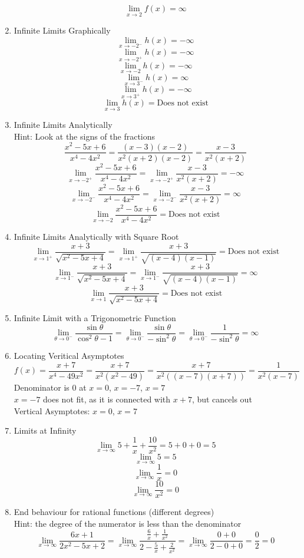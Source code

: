 \documentclass{article}
\begin{document}
\begin{enumerate}
		$$\lim_{x \to 2}{f(x)} = \infty$$
	\item Infinite Limits Graphically
		$$\lim_{x \to -2^-}{h(x)} = - \infty$$
		$$\lim_{x \to -2^+}{h(x)} = - \infty$$
		$$\lim_{x \to -2}{h(x)} = - \infty$$
		$$\lim_{x \to 3^-}{h(x)} = \infty$$
		$$\lim_{x \to 3^+}{h(x)} = - \infty$$
		$$\lim_{x \to 3}{h(x)} = \text{Does not exist}$$
	\item Infinite Limits Analytically
		\\ Hint: Look at the signs of the fractions
		$$\frac{x^2-5x+6}{x^4-4x^2} = \frac{(x - 3)(x - 2)}{x^2(x + 2)(x - 2)} = \frac{x-3}{x^2(x+2)}$$
		$$\lim_{x \to -2^+}{\frac{x^2 - 5x + 6}{x^4 - 4x^2}} = \lim_{x \to -2^+}{\frac{x-3}{x^2(x+2)}} = - \infty$$
		$$\lim_{x \to -2^-}{\frac{x^2 - 5x + 6}{x^4 - 4x^2}} = \lim_{x \to -2^-}{\frac{x-3}{x^2(x+2)}} = \infty$$
		$$\lim_{x \to -2}{\frac{x^2 - 5x + 6}{x^4 - 4x^2}} = \text{Does not exist}$$
	\item Infinite Limits Analytically with Square Root
		$$\lim_{x \to 1^+}{\frac{x + 3}{\sqrt{x^2 - 5x + 4}}} = \lim_{x \to 1^+}{\frac{x + 3}{\sqrt{(x-4)(x-1)}}} = \text{Does not exist}$$
		$$\lim_{x \to 1^-}{\frac{x + 3}{\sqrt{x^2 - 5x + 4}}} = \lim_{x \to 1^-}{\frac{x + 3}{\sqrt{(x-4)(x-1)}}} = \infty$$
		$$\lim_{x \to 1}{\frac{x + 3}{\sqrt{x^2 - 5x + 4}}} = \text{Does not exist}$$
	\item Infinite Limit with a Trigonometric Function
		$$\lim_{\theta \to 0^-}{\frac{\sin{\theta}}{\cos^2{\theta} - 1}} = \lim_{\theta \to 0^-}{\frac{\sin{\theta}}{- \sin^2{\theta}}} = \lim_{\theta \to 0^-}{\frac{1}{- \sin^2{\theta}}} = \infty$$
	\item Locating Veritical Asymptotes
		$$f(x) = \frac{x + 7}{x^4 - 49x^2} = \frac{x+7}{x^2(x^2-49)} = \frac{x+7}{x^2((x-7)(x+7))} = \frac{1}{x^2(x-7)}$$
		Denominator is $0$ at $x=0$, $x=-7$, $x=7$ \\
		$x=-7$ does not fit, as it is connected with $x+7$, but cancels out \\
		Vertical Asymptotes: $x = 0$, $x = 7$
	\item Limits at Infinity
		$$\lim_{x \to \infty}{5 + \frac{1}{x} + \frac{10}{x^2}} = 5 + 0 + 0 = 5$$
		$$\lim_{x \to \infty}{5} = 5$$
		$$\lim_{x \to \infty}{\frac{1}{x}} = 0$$
		$$\lim_{x \to \infty}{\frac{10}{x^2}} = 0$$
	\item End behaviour for rational functions (different degrees)
		\\ Hint: the degree of the numerator is less than the denominator
		$$\lim_{x \to \infty}{\frac{6x+1}{2x^2 - 5x + 2}} = \lim_{x \to \infty}{\frac{\frac{6}{x} + \frac{1}{x^2}}{2 - \frac{5}{x} + \frac{2}{x^2}}} = \lim_{x \to \infty}{\frac{0 + 0}{2 - 0 + 0}} = \frac{0}{2} = 0$$

\end{enumerate}
\end{document}
